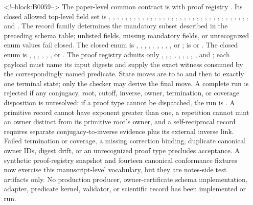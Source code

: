\documentclass[11pt,a4paper]{article}
\begin{document}
<!--block:B0059-->
The paper-level common contract is  with proof registry . Its closed allowed top-level field set is , , , , , , , , , , , , , , , , , , , , , , , , , , , , , , , , , , and . The record family determines the mandatory subset described in the preceding schema table; unlisted fields, missing mandatory fields, or unrecognized enum values fail closed. The closed  enum is , , , , , , , , , or ;  is  or . The closed  enum is , , , , , , or . The proof registry admits only , , , , , , , , , and ; each payload must name its input digests and supply the exact witness consumed by the correspondingly named predicate. State moves are  to  to  and then to exactly one terminal state; only the checker may derive the final move. A complete run is rejected if any conjugacy, root, cutoff, inverse, owner, termination, or coverage disposition is unresolved; if a proof type cannot be dispatched, the run is . A primitive record cannot have exponent greater than one, a repetition cannot mint an owner distinct from its primitive root's owner, and a self-reciprocal record requires separate conjugacy-to-inverse evidence plus its external inverse link. Failed termination or coverage, a missing correction binding, duplicate canonical owner IDs, digest drift, or an unrecognized proof type precludes acceptance. A synthetic proof-registry snapshot and fourteen canonical conformance fixtures now exercise this manuscript-level vocabulary, but they are notes-side test artifacts only. No production producer, owner-certificate schema implementation, adapter, predicate kernel, validator, or scientific record has been implemented or run.
\end{document}
